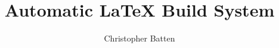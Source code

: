 \documentclass{article}
\begin{document}

\title  {Automatic \LaTeX{} Build System}
\author {Christopher Batten}
\date   {}

\maketitle





\end{document}
